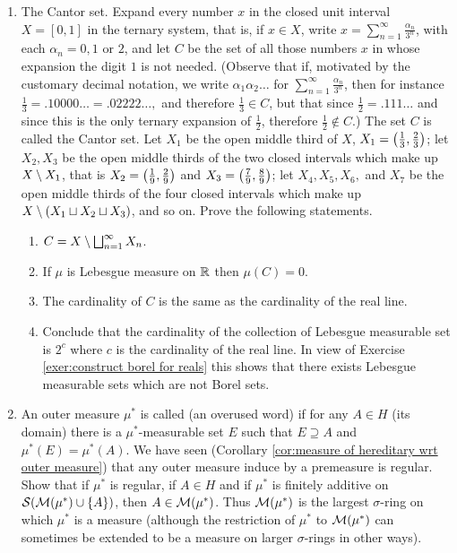 \begin{enumerate}[label=\arabic*),ref=\arabic*]
\item\label{exer:cantor set}
The Cantor set. Expand every number $x$ in the closed unit interval $X=[0,1]$ in the ternary system, that is, if $x\in X$, write $x=\sum_{n=1}^\infty\frac{\alpha_n}{3^n}$, with each $\alpha_n=0,1$ or $2$, and let $C$ be the set of all those numbers $x$ in whose expansion the digit $1$ is not needed. (Observe that if, motivated by the customary decimal notation, we write $\alpha_1\alpha_2\dots$ for $\sum_{n=1}^\infty\frac{\alpha_n}{3^n}$, then for instance $\frac13=.10000\dots=.02222\dots,$ and therefore $\frac13\in C$, but that since $\frac12=.111\dots$ and since this is the only ternary expansion of $\frac12$, therefore $\frac12\notin C$.) The set $C$ is called the Cantor set. Let $X_1$ be the open middle third of $X$, $X_1=\left(\frac13,\frac23\right)$; let $X_2,X_3$ be the open middle thirds of the two closed intervals which make up $X\setminus X_1$, that is $X_2=\left(\frac19,\frac29\right)$ and $X_3=\left(\frac79,\frac89\right)$; let $X_4,X_5,X_6,$ and $X_7$ be the open middle thirds of the four closed intervals which make up $X\setminus(X_1\sqcup X_2\sqcup X_3)$, and so on. Prove the following statements.
\begin{enumerate}
\item $C=X\setminus\bigsqcup_{n=1}^\infty X_n$.
\item If $\mu$ is Lebesgue measure on $\mathbb{R}$ then $\mu(C)=0$.
\item The cardinality of $C$ is the same as the cardinality of the real line.
\item Conclude that the cardinality of the collection of Lebesgue measurable set is $2^c$ where $c$ is the cardinality of the real line. In view of Exercise \ref{exer:construct borel for reals} this shows that there exists Lebesgue measurable sets which are not Borel sets.
\end{enumerate}

\item An outer measure $\mu^*$ is called  (an overused word) if for any $A\in H$ (its domain) there is a $\mu^*$-measurable set $E$ such that $E\supseteq A$ and $\mu^*(E)=\mu^*(A)$. We have seen (Corollary \ref{cor:measure of hereditary wrt outer measure}) that any outer measure induce by a premeasure is regular. Show that if $\mu^*$ is regular, if $A\in H$ and if $\mu^*$ is finitely additive on ${\cal S}({\cal M}(\mu^*)\cup\left\{A\right\})$, then $A\in{\cal M}(\mu^*)$. Thus ${\cal M}(\mu^*)$ is the largest $\sigma$-ring on which $\mu^*$ is a measure (although the restriction of $\mu^*$ to ${\cal M}(\mu^*)$ can sometimes be extended to be a measure on larger $\sigma$-rings in other ways).


\end{enumerate}
